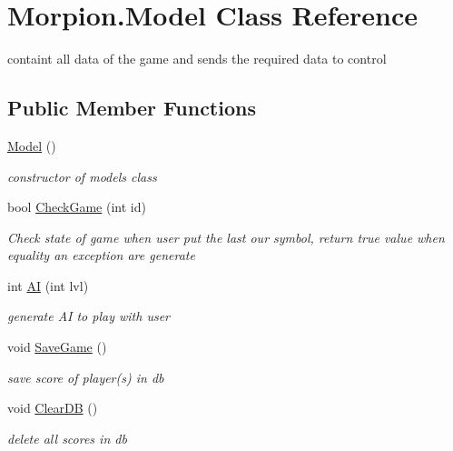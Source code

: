 \hypertarget{class_morpion_1_1_model}{}\section{Morpion.\+Model Class Reference}
\label{class_morpion_1_1_model}


containt all data of the game and sends the required data to control  


\subsection*{Public Member Functions}
\begin{DoxyCompactItemize}
\item 
\hyperlink{class_morpion_1_1_model_a459b4901421170316a320d2e7d6408b4}{Model} ()
\begin{DoxyCompactList}\small\item\em constructor of model\textquotesingle{}s class \end{DoxyCompactList}\item 
bool \hyperlink{class_morpion_1_1_model_a76f2eb1ec20a4aa78cca17514a0b94e1}{Check\+Game} (int id)
\begin{DoxyCompactList}\small\item\em Check state of game when user put the last our symbol, return true value when equality an exception are generate \end{DoxyCompactList}\item 
int \hyperlink{class_morpion_1_1_model_a02dd1ba77ebd6563c86164592b339ed0}{AI} (int lvl)
\begin{DoxyCompactList}\small\item\em generate AI to play with user \end{DoxyCompactList}\item 
void \hyperlink{class_morpion_1_1_model_af97f1128b5beaa34f151304c84ee1a80}{Save\+Game} ()
\begin{DoxyCompactList}\small\item\em save score of player(s) in db \end{DoxyCompactList}\item 
void \hyperlink{class_morpion_1_1_model_ab5dee79623ee37ae8ccb63bade900dcf}{Clear\+DB} ()
\begin{DoxyCompactList}\small\item\em delete all scores in db \end{DoxyCompactList}\end{DoxyCompactItemize}
